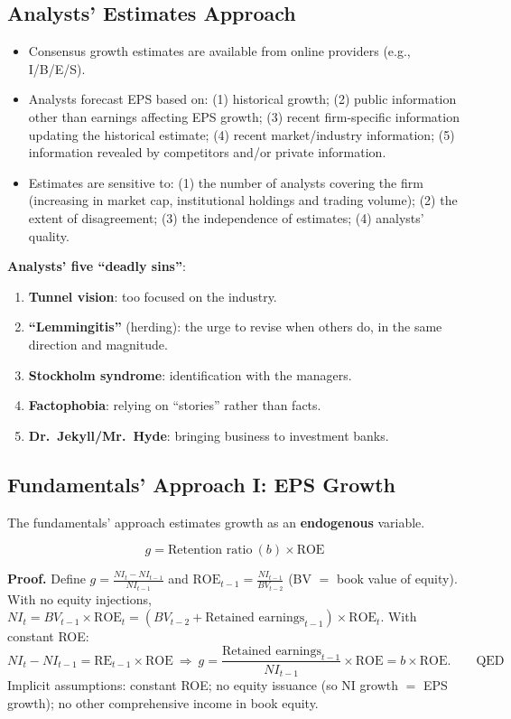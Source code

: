 \subsection{Analysts' Estimates Approach}
\begin{itemize}
  \item Consensus growth estimates are available from online providers (e.g., I/B/E/S).
  \item Analysts forecast EPS based on: (1) historical growth; (2) public information other than earnings affecting EPS growth; (3) recent firm-specific information updating the historical estimate; (4) recent market/industry information; (5) information revealed by competitors and/or private information.
  \item Estimates are sensitive to: (1) the number of analysts covering the firm (increasing in market cap, institutional holdings and trading volume); (2) the extent of disagreement; (3) the independence of estimates; (4) analysts' quality.
\end{itemize}
\textbf{Analysts' five ``deadly sins''}:
\begin{enumerate}[label=(\roman*)]
  \item \textbf{Tunnel vision}: too focused on the industry.
  \item \textbf{``Lemmingitis''} (herding): the urge to revise when others do, in the same direction and magnitude.
  \item \textbf{Stockholm syndrome}: identification with the managers.
  \item \textbf{Factophobia}: relying on ``stories'' rather than facts.
  \item \textbf{Dr.\ Jekyll/Mr.\ Hyde}: bringing business to investment banks.
\end{enumerate}

\subsection{Fundamentals' Approach I: EPS Growth}
The fundamentals' approach estimates growth as an \textbf{endogenous} variable.
\begin{keybox}
\[
g=\text{Retention ratio}\ (b)\times\text{ROE}
\]
\end{keybox}
\textbf{Proof.} Define $g=\frac{NI_t-NI_{t-1}}{NI_{t-1}}$ and $\text{ROE}_{t-1}=\frac{NI_{t-1}}{BV_{t-2}}$ (BV $=$ book value of equity). With no equity injections, $NI_t=BV_{t-1}\times\text{ROE}_t=(BV_{t-2}+\text{Retained earnings}_{t-1})\times\text{ROE}_t$. With constant ROE:
\[
NI_t-NI_{t-1}=\text{RE}_{t-1}\times\text{ROE}\ \Rightarrow\ g=\frac{\text{Retained earnings}_{t-1}}{NI_{t-1}}\times\text{ROE}=b\times\text{ROE}.\qquad\text{QED}
\]
Implicit assumptions: constant ROE; no equity issuance (so NI growth $=$ EPS growth); no other comprehensive income in book equity.

